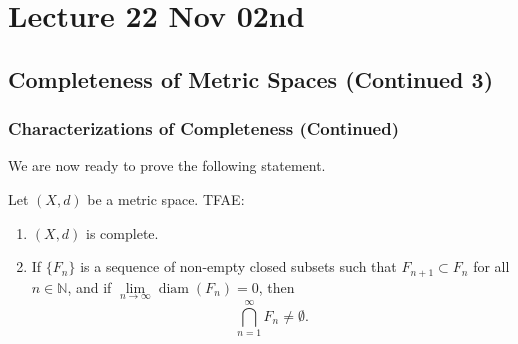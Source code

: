 \documentclass[notoc,notitlepage]{tufte-book}
\DeclareMathOperator{\diam}{diam }
\begin{document}
\chapter{Lecture 22 Nov 02nd}%
\label{chp:lecture_22_nov_02nd}

\section{Completeness of Metric Spaces (Continued 3)}%
\label{sec:completeness_of_metric_spaces_continued_3}

\subsection{Characterizations of Completeness (Continued)}%
\label{sub:characterizations_of_completeness_continued}

We are now ready to prove the following statement.

\begin{thm}\label{thm:cantor_s_intersection_principle}
  Let $(X, d)$ be a metric space. TFAE:
  \begin{enumerate}
    \item $(X, d)$ is complete.
    \item If $\{ F_n \}$ is a sequence of non-empty closed subsets such that $F_{n + 1} \subset F_n$ for all $n \in \mathbb{N}$, and if $\lim\limits_{n \to \infty} \diam(F_n) = 0$, then
      \begin{equation*}
        \bigcap_{n = 1}^{\infty} F_n \neq \emptyset.
      \end{equation*}
  \end{enumerate}
\end{thm}
\end{document}
